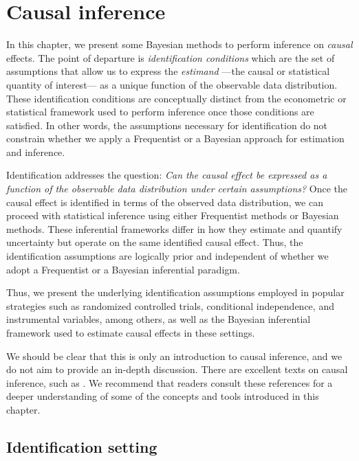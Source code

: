 \chapter{Causal inference}\label{chap12}

In this chapter, we present some Bayesian methods to perform inference on \textit{causal} effects. The point of departure is \textit{identification conditions} which are the set of assumptions that allow us to express the \textit{estimand} —the causal or statistical quantity of interest— as a unique function of the observable data distribution. These identification conditions are conceptually distinct from the econometric or statistical framework used to perform inference once those conditions are satisfied. In other words, the assumptions necessary for identification do not constrain whether we apply a Frequentist or a Bayesian approach for estimation and inference.

Identification addresses the question: \textit{Can the causal effect be expressed as a function of the observable data distribution under certain assumptions?} Once the causal effect is identified in terms of the observed data distribution, we can proceed with statistical inference using either Frequentist methods or Bayesian methods. These inferential frameworks differ in how they estimate and quantify uncertainty but operate on the same identified causal effect. Thus, the identification assumptions are logically prior and independent of whether we adopt a Frequentist or a Bayesian inferential paradigm.

Thus, we present the underlying identification assumptions employed in popular strategies such as randomized controlled trials, conditional independence, and instrumental variables, among others, as well as the Bayesian inferential framework used to estimate causal effects in these settings. 

We should be clear that this is only an introduction to causal inference, and we do not aim to provide an in-depth discussion. There are excellent texts on causal inference, such as \cite{angrist2009mostly,angrist2014mastering,imbens2015causal,hernan2020causal,cunningham2021causal,chernozhukov2024applied}. We recommend that readers consult these references for a deeper understanding of some of the concepts and tools introduced in this chapter.

\section{Identification setting}\label{chap12_1}

